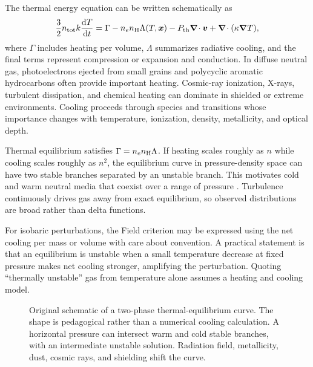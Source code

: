 The thermal energy equation can be written schematically as
\begin{equation}
 \frac{3}{2}n_{\rm tot}k\frac{\mathrm{d}T}{\mathrm{d}t}
 =\Gamma-n_en_{\rm H}\Lambda(T,\boldsymbol{x})
 -P_{\rm th}\boldsymbol{\nabla}\!\cdot\boldsymbol{v}
 +\boldsymbol{\nabla}\!\cdot(\kappa\boldsymbol{\nabla}T),
 \label{eq:thermal-energy-ism}
\end{equation}
where $\Gamma$ includes heating per volume, $\Lambda$ summarizes radiative cooling,
and the final terms represent compression or expansion and conduction.  In diffuse
neutral gas, photoelectrons ejected from small grains and polycyclic aromatic
hydrocarbons often provide important heating.  Cosmic-ray ionization, X-rays,
turbulent dissipation, and chemical heating can dominate in shielded or extreme
environments.  Cooling proceeds through species and transitions whose importance
changes with temperature, ionization, density, metallicity, and optical depth.

Thermal equilibrium satisfies $\Gamma=n_en_{\rm H}\Lambda$.  If heating scales
roughly as $n$ while cooling scales roughly as $n^2$, the equilibrium curve in
pressure-density space can have two stable branches separated by an unstable branch.
This motivates cold and warm neutral media that coexist over a range of pressure
\citep{WolfireEtAl2003}.  Turbulence continuously drives gas away from exact
equilibrium, so observed distributions are broad rather than delta functions.

For isobaric perturbations, the Field criterion may be expressed using the net
cooling per mass or volume with care about convention.  A practical statement is that
an equilibrium is unstable when a small temperature decrease at fixed pressure makes
net cooling stronger, amplifying the perturbation.  Quoting ``thermally unstable''
gas from temperature alone assumes a heating and cooling model.

\begin{figure}[tbp]
\centering
{}
\caption{Original schematic of a two-phase thermal-equilibrium curve.  The shape is
pedagogical rather than a numerical cooling calculation.  A horizontal pressure can
intersect warm and cold stable branches, with an intermediate unstable solution.
Radiation field, metallicity, dust, cosmic rays, and shielding shift the curve.}
\label{fig:two-phase-schematic}
\end{figure}

